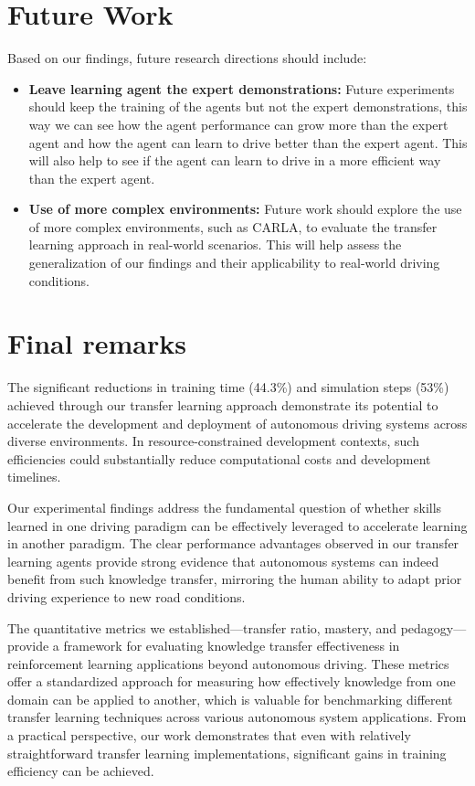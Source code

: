 \section{Future Work}
Based on our findings, future research directions should include:

\begin{itemize}
    \item \textbf{Leave learning agent the expert demonstrations:} Future experiments should keep the training of the agents but not the expert demonstrations, this way we can see how the agent performance can grow more than the expert agent and how the agent can learn to drive better than the expert agent. This will also help to see if the agent can learn to drive in a more efficient way than the expert agent.

    \item \textbf{Use of more complex environments:} Future work should explore the use of more complex environments, such as CARLA, to evaluate the transfer learning approach in real-world scenarios. This will help assess the generalization of our findings and their applicability to real-world driving conditions.

\end{itemize}

\section{Final remarks}
The significant reductions in training time (44.3\%) and simulation steps (53\%) achieved through our transfer learning approach demonstrate its potential to accelerate the development and deployment of autonomous driving systems across diverse environments. In resource-constrained development contexts, such efficiencies could substantially reduce computational costs and development timelines.

Our experimental findings address the fundamental question of whether skills learned in one driving paradigm can be effectively leveraged to accelerate learning in another paradigm. The clear performance advantages observed in our transfer learning agents provide strong evidence that autonomous systems can indeed benefit from such knowledge transfer, mirroring the human ability to adapt prior driving experience to new road conditions.

The quantitative metrics we established—transfer ratio, mastery, and pedagogy—provide a framework for evaluating knowledge transfer effectiveness in reinforcement learning applications beyond autonomous driving. These metrics offer a standardized approach for measuring how effectively knowledge from one domain can be applied to another, which is valuable for benchmarking different transfer learning techniques across various autonomous system applications. From a practical perspective, our work demonstrates that even with relatively straightforward transfer learning implementations, significant gains in training efficiency can be achieved.